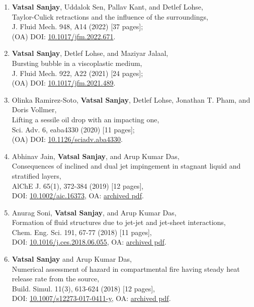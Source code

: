 \documentclass[10pt,a4paper,colorlinks,linkcolor=blue,urlcolor=blue,citecolor=blue]{moderncv}
\begin{document}
\begin{enumerate}[leftmargin=1.25em]
	\item \textbf{Vatsal Sanjay}, Uddalok Sen, Pallav Kant, and Detlef Lohse,\\
	Taylor-Culick retractions and the influence of the surroundings,\\
	J. Fluid Mech. 948, A14  (2022) [37 pages];\\
	(OA) DOI: \href{https://doi.org/10.1017/jfm.2022.671}{10.1017/jfm.2022.671}.

	\item \textbf{Vatsal Sanjay}, Detlef Lohse, and Maziyar Jalaal,\\
	Bursting bubble in a viscoplastic medium,\\
	J. Fluid Mech. 922, A22  (2021) [24 pages];\\
	(OA) DOI: \href{https://doi.org/10.1017/jfm.2021.489}{10.1017/jfm.2021.489}.

	\item Olinka Ramirez-Soto, \textbf{Vatsal Sanjay},  Detlef Lohse,  Jonathan T. Pham, and Doris Vollmer,\\
	Lifting a sessile oil drop with an impacting one,\\
	Sci. Adv. 6, eaba4330  (2020) [11 pages];\\
	(OA) DOI: \href{https://doi.org/10.1126/sciadv.aba4330}{10.1126/sciadv.aba4330}.

	\item Abhinav Jain, \textbf{Vatsal Sanjay}, and Arup Kumar Das,\\
	Consequences of inclined and dual jet impingement in stagnant liquid and stratified layers,\\
	AlChE J. 65(1), 372-384  (2019) [12 pages],\\
	DOI: \href{https://doi.org/10.1002/aic.16373}{10.1002/aic.16373}, OA: \href{https://tinyurl.com/24p5dy8s}{archived pdf}.

	\item Anurag Soni, \textbf{Vatsal Sanjay}, and Arup Kumar Das,\\
	Formation of fluid structures due to jet-jet and jet-sheet interactions,\\
	Chem. Eng. Sci. 191, 67-77  (2018) [11 pages],\\
	DOI: \href{https://doi.org/10.1016/j.ces.2018.06.055}{10.1016/j.ces.2018.06.055}, OA: \href{https://tinyurl.com/2bv5fznd}{archived pdf}.

	\item \textbf{Vatsal Sanjay} and Arup Kumar Das,\\
	Numerical assessment of hazard in compartmental fire having steady heat release rate from the source,\\
	Build. Simul. 11(3), 613-624  (2018) [12 pages],\\
	DOI: \href{https://doi.org/10.1007/s12273-017-0411-y}{10.1007/s12273-017-0411-y}, OA: \href{https://tinyurl.com/2bwhzlzv}{archived pdf}.


\end{enumerate}
\end{document}
